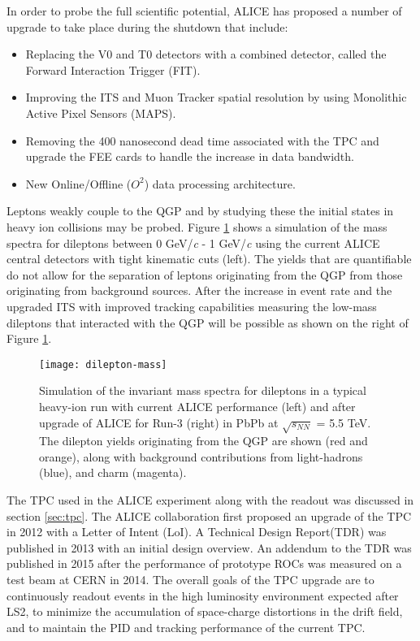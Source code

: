 \noindent
In order to probe the full scientific potential, ALICE has proposed a number of upgrade \cite{1742-6596-589-1-012014} to take place during the shutdown that include:

\begin{itemize}
\item Replacing the V0 and T0 detectors with a combined detector, called the Forward Interaction Trigger (FIT)\cite{1742-6596-798-1-012186}.
\item Improving the ITS and Muon Tracker spatial resolution by using  Monolithic Active Pixel Sensors (MAPS)\cite{Abelev:1625842}\cite{CERN-LHCC-2015-001}.
\item Removing the 400 nanosecond dead time associated with the TPC and upgrade the FEE cards to handle the increase in data bandwidth\cite{Abelev:1475243}.
\item New Online/Offline ($O^{2}$) data processing architecture\cite{Buncic:2011297}.
\end{itemize}

\noindent
Leptons weakly couple to the QGP\cite{Ryblewski:2015sha} and by studying these the initial states in heavy ion collisions may be probed\cite{Mauricio:2007vz}.  Figure  \ref{fig:lowmassdilep} shows a simulation of the mass spectra for dileptons between 0 GeV/\textit{c} - 1 GeV/\textit{c} using the current ALICE central detectors with tight kinematic cuts (left).  The yields that are quantifiable do not allow for the separation of leptons originating from the QGP from those originating from background sources.  After the increase in event rate and the upgraded ITS with improved tracking capabilities measuring the low-mass dileptons that interacted with the QGP will be possible as shown on the right of Figure \ref{fig:lowmassdilep}. 

\begin{figure}[h]
\texttt{[image: dilepton-mass]}
\centering
\caption{Simulation of the invariant  mass spectra for dileptons in a typical heavy-ion run with current ALICE performance (left) and after upgrade of ALICE for Run-3 (right) in PbPb at $\sqrt{s_{NN}}$ = 5.5 TeV.  The dilepton yields originating from the QGP are shown (red and orange), along with background contributions from light-hadrons (blue), and charm (magenta)\cite{Abelev:1475243}.}
\label{fig:lowmassdilep}
\end{figure}

\noindent
The TPC used in the ALICE experiment along with the readout was discussed in section \ref{sec:tpc}.  The ALICE collaboration first proposed an upgrade of the TPC in 2012 with a Letter of Intent (LoI)\cite{Abelev:1475243}.  A Technical Design Report(TDR)\cite{CERN-LHCC-2013-020} was published in 2013 with an initial design overview.  An addendum to the TDR\cite{CERN-LHCC-2015-002} was published in 2015 after the performance of prototype ROCs was measured on a test beam at CERN in 2014.  The overall goals of the TPC upgrade are to continuously readout events in the high luminosity environment expected after LS2, to minimize the accumulation of space-charge distortions in the drift field, and to maintain the PID and tracking performance of the current TPC.


